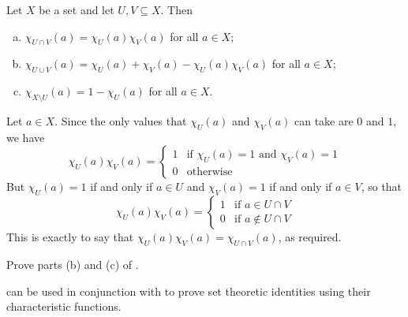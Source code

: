 \begin{theorem}
\label{thmSetIdentitiesFromCharacteristicFunctions}
Let $X$ be a set and let $U,V \subseteq X$. Then
\begin{enumerate}[(a)]
\item $\chi_{U \cap V}(a) = \chi_U(a) \chi_V(a)$ for all $a \in X$;
\item $\chi_{U \cup V}(a) = \chi_U(a) + \chi_V(a) - \chi_U(a)\chi_V(a)$ for all $a \in X$;
\item $\chi_{X \setminus U}(a) = 1 - \chi_U(a)$ for all $a \in X$.
\end{enumerate}
\end{theorem}

\begin{cproof}[of {(a)}]
Let $a \in X$. Since the only values that $\chi_U(a)$ and $\chi_V(a)$ can take are $0$ and $1$, we have
\[ \chi_U(a) \chi_V(a) = \begin{cases} 1 & \text{if $\chi_U(a) = 1$ and $\chi_V(a) = 1$} \\ 0 & \text{otherwise} \end{cases} \]
But $\chi_U(a) = 1$ if and only if $a \in U$ and $\chi_V(a) = 1$ if and only if $a \in V$, so that
\[ \chi_U(a) \chi_V(a) = \begin{cases} 1 & \text{if $a \in U \cap V$} \\ 0 & \text{if $a \not\in U \cap V$} \end{cases} \]
This is exactly to say that $\chi_U(a) \chi_V(a) = \chi_{U \cap V}(a)$, as required.
\end{cproof}

\begin{exercise}
Prove parts (b) and (c) of .
\end{exercise}

 can be used in conjunction with  to prove set theoretic identities using their characteristic functions.

